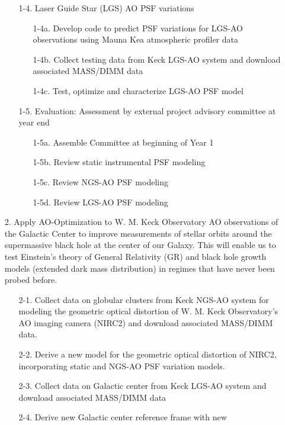 \begin{itemize}
\begin{itemize}
\begin{itemize}
        \end{itemize}
    \item[1-4.] Laser Guide Star (LGS) AO PSF variations
        \begin{itemize}
        \item[1-4a.] Develop code to predict PSF variations for LGS-AO observations
            using Mauna Kea atmospheric profiler data
        \item[1-4b.] Collect testing data from Keck LGS-AO system and download
            associated MASS/DIMM data
        \item[1-4c.] Test, optimize and characterize LGS-AO PSF model
        \end{itemize}
    \item[1-5.] Evaluation: Assessment by external project advisory committee at year end
        \begin{itemize}
        \item[1-5a.] Assemble Committee at beginning of Year 1
        \item[1-5b.] Review static instrumental PSF modeling 
        \item[1-5c.] Review NGS-AO PSF modeling
        \item[1-5d.] Review LGS-AO PSF modeling
        \end{itemize}
    \end{itemize}
\item[2.] Apply AO-Optimization to W. M. Keck Observatory AO observations
  of the Galactic Center to improve measurements of stellar orbits
  around the supermassive black hole at the center of our Galaxy. This
  will enable us to test Einstein’s theory of General Relativity (GR)
  and black hole growth models (extended dark mass distribution) in
  regimes that have never been probed before.
  \begin{itemize}
  \item[2-1.] Collect data on globular clusters from Keck NGS-AO system
    for modeling the geometric optical distortion of W. M. Keck
    Observatory’s AO imaging camera (NIRC2) and download associated
    MASS/DIMM data.
  \item[2-2.] Derive a new model for the geometric optical distortion
    of NIRC2, incorporating static and NGS-AO PSF variation models.
  \item[2-3.] Collect data on Galactic center from Keck LGS-AO system
    and download associated MASS/DIMM data
  \item[2-4.] Derive new Galactic center reference frame with new

\end{itemize}
\end{itemize}
